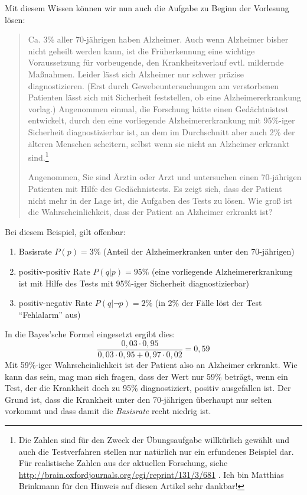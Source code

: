 Mit diesem Wissen können wir nun auch die Aufgabe zu Beginn der Vorlesung lösen:
\begin{quotation}
 Ca. 3\% aller 70-jährigen haben Alzheimer. Auch
wenn Alzheimer bisher nicht geheilt werden kann, ist die
Früherkennung eine wichtige Voraussetzung für vorbeugende, den
Krankheitsverlauf evtl. mildernde Maßnahmen. Leider lässt sich
Alzheimer nur schwer präzise diagnostizieren. (Erst durch
Gewebeuntersuchungen am verstorbenen Patienten lässt sich mit
Sicherheit feststellen, ob eine Alzheimererkrankung vorlag.)
Angenommen einmal, die Forschung hätte einen Gedächtnistest
entwickelt, durch den eine vorliegende Alzheimererkrankung
mit 95\%-iger Sicherheit diagnostizierbar ist, an dem im
Durchschnitt aber auch 2\% der älteren Menschen scheitern, selbst wenn sie
nicht an Alzheimer erkrankt sind.\footnote{Die Zahlen sind für den Zweck der
Übungsaufgabe willkürlich gewählt und auch die Testverfahren stellen nur
natürlich nur ein erfundenes Beispiel dar. Für realistische Zahlen aus der
aktuellen Forschung, siehe
\url{http://brain.oxfordjournals.org/cgi/reprint/131/3/681}
\cite[]{kloeppel:2008}. Ich bin Matthias Brinkmann für den Hinweis auf diesen 
Artikel sehr dankbar!}
  

Angenommen, Sie sind Ärztin oder Arzt und untersuchen einen
70-jährigen Patienten mit Hilfe des Gedächnistests. Es zeigt sich, dass
der Patient nicht mehr in der Lage ist, die Aufgaben des Tests zu lösen. Wie
groß ist die Wahrscheinlichkeit, dass der Patient an Alzheimer erkrankt ist?
\end{quotation}
Bei diesem Beispiel, gilt offenbar: 

\begin{enumerate}
  \item Basisrate $P(p) = 3\%$ (Anteil der Alzheimerkranken unter den
  70-jährigen)
  \item positiv-positiv Rate $P(q|p) = 95\%$ (eine vorliegende
  Alzheimererkrankung ist mit Hilfe des Tests mit 95\%-iger Sicherheit diagnostizierbar)
  \item positiv-negativ Rate $P(q|\neg p)= 2\%$ (in 2\% der Fälle löst der Test
  "`Fehlalarm"' aus)
\end{enumerate}
 
 In die Bayes'sche Formel eingesetzt ergibt dies: 
 \[ \frac{0,03\cdot 0,95}{0,03\cdot 0,95 + 0,97\cdot 0,02} = 0,59 \]
 Mit 59\%-iger Wahrscheinlichkeit ist der Patient also an Alzheimer erkrankt.
 Wie kann das sein, mag man sich fragen, dass der Wert nur 59\% beträgt, wenn
 ein Test, der die Krankheit doch zu 95\% diagnostiziert, positiv ausgefallen
 ist. Der Grund ist, dass die Krankheit
 unter den 70-jährigen überhaupt nur selten vorkommt und dass 
 damit die {\em Basisrate} recht niedrig ist.
 
